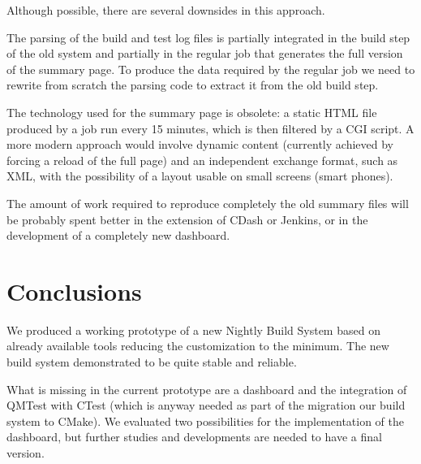 \documentclass{lhcbnote}
\begin{document}
Although possible, there are several downsides in this approach.

The parsing of the build and test log files is partially integrated in the build
step of the old system and partially in the regular job that generates the full
version of the summary page.  To produce the data required by the regular job we
need to rewrite from scratch the parsing code to extract it from the old build
step.

The technology used for the summary page is obsolete: a static HTML file
produced by a job run every 15 minutes, which is then filtered by a CGI script.
A more modern approach would involve dynamic content (currently achieved by
forcing a reload of the full page) and an independent exchange format, such as
XML, with the possibility of a layout usable on small screens (smart phones).

The amount of work required to reproduce completely the old summary files will
be probably spent better in the extension of CDash or Jenkins, or in the
development of a completely new dashboard.


\section{Conclusions}
We produced a working prototype of a new Nightly Build System based on already
available tools reducing the customization to the minimum.  The new build system
demonstrated to be quite stable and reliable.

What is missing in the current prototype are a dashboard and the integration of
QMTest with CTest (which is anyway needed as part of the migration our build
system to CMake).  We evaluated two possibilities for the implementation of the
dashboard, but further studies and developments are needed to have a final
version.


%


\appendix
\end{document}
